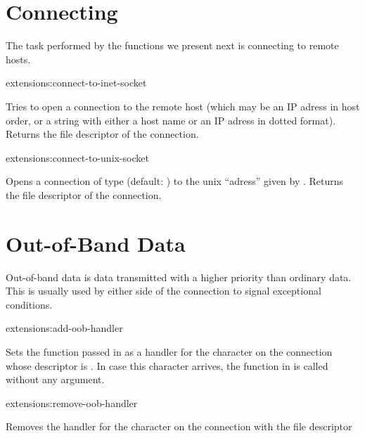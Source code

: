 \section{Connecting}

The task performed by the functions we present next is connecting to
remote hosts.

\begin{defun}{extensions:}{connect-to-inet-socket}{%
    }

  Tries to open a connection to the remote host  (which may
  be an IP adress in host order, or a string with either a host name
  or an IP adress in dotted format). Returns the file descriptor of
  the connection.

\end{defun}

\begin{defun}{extensions:}{connect-to-unix-socket}{%
    }
  
  Opens a connection of type  (default: ) to the
  unix ``adress'' given by . Returns the file descriptor of
  the connection.

\end{defun}

\section{Out-of-Band Data}

Out-of-band data is data transmitted with a higher priority than
ordinary data. This is usually used by either side of the connection
to signal exceptional conditions.

\begin{defun}{extensions:}{add-oob-handler}{%
    }
  
  Sets the function passed in  as a handler for the
  character  on the connection whose descriptor is .
  In case this character arrives, the function in  is
  called without any argument.

\end{defun}

\begin{defun}{extensions:}{remove-oob-handler}{%
    }

  Removes the handler for the character  on the connection
  with the file descriptor 

\end{defun}

